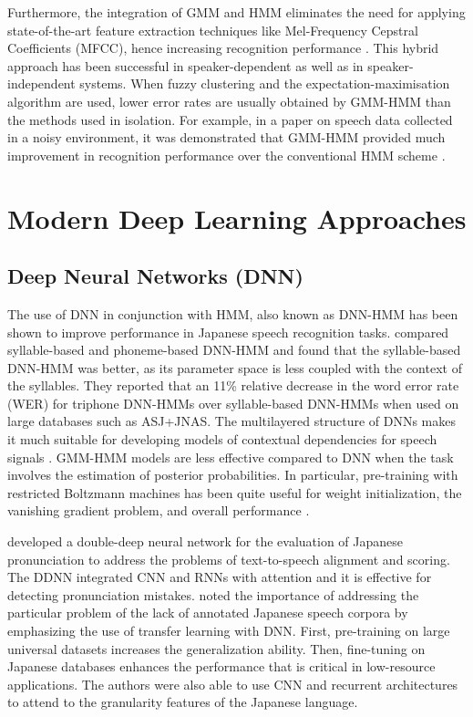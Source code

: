 Furthermore, the integration of GMM and HMM eliminates the need for applying state-of-the-art feature extraction techniques like Mel-Frequency Cepstral Coefficients (MFCC), hence increasing recognition performance \parencite{nicita1}. This hybrid approach has been successful in speaker-dependent as well as in speaker-independent systems. When fuzzy clustering and the expectation-maximisation algorithm are used, lower error rates are usually obtained by GMM-HMM than the methods used in isolation. For example, in a paper on speech data collected in a noisy environment, it was demonstrated that GMM-HMM provided much improvement in recognition performance over the conventional HMM scheme \parencite{taheri2006fuzzy, nicita1}.


\section{Modern Deep Learning Approaches}
\subsection{Deep Neural Networks (DNN)}
The use of DNN in conjunction with HMM, also known as DNN-HMM has been shown to improve performance in Japanese speech recognition tasks. \textcite{seki2014comparison} compared syllable-based and phoneme-based DNN-HMM and found that the syllable-based DNN-HMM was better, as its parameter space is less coupled with the context of the syllables. They reported that an 11\% relative decrease in the word error rate (WER) for triphone DNN-HMMs over syllable-based DNN-HMMs when used on large databases such as ASJ+JNAS. The multilayered structure of DNNs makes it much suitable for developing models of contextual dependencies for speech signals \parencite{hojo2018dnn}. GMM-HMM models are less effective compared to DNN when the task involves the estimation of posterior probabilities. In particular, pre-training with restricted Boltzmann machines has been quite useful for weight initialization, the vanishing gradient problem, and overall performance \parencite{Mimura2013CSJ}.

\textcite{mu2020japanese} developed a double-deep neural network for the evaluation of Japanese pronunciation to address the problems of text-to-speech alignment and scoring. The DDNN integrated CNN and RNNs with attention and it is effective for detecting pronunciation mistakes. \textcite{lin2017dnn} noted the importance of addressing the particular problem of the lack of annotated Japanese speech corpora by emphasizing the use of transfer learning with DNN. First, pre-training on large universal datasets increases the generalization ability. Then, fine-tuning on Japanese databases enhances the performance that is critical in low-resource applications. The authors were also able to use CNN and recurrent architectures to attend to the granularity features of the Japanese language.

